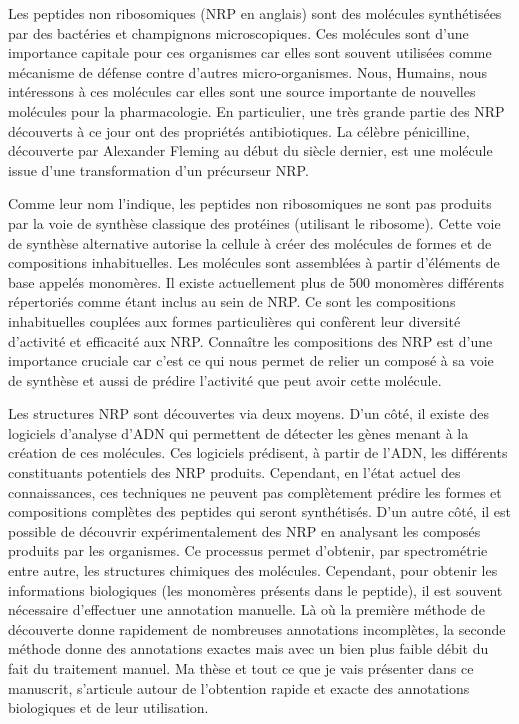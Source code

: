 Les peptides non ribosomiques (NRP en anglais) sont des molécules synthétisées par des bactéries et champignons microscopiques.
Ces molécules sont d'une importance capitale pour ces organismes car elles sont souvent utilisées comme mécanisme de défense contre d'autres micro-organismes.
Nous, Humains, nous intéressons à ces molécules car elles sont une source importante de nouvelles molécules pour la pharmacologie.
En particulier, une très grande partie des NRP découverts à ce jour ont des propriétés antibiotiques.
La célèbre pénicilline, découverte par Alexander Fleming au début du siècle dernier, est une molécule issue d'une transformation d'un précurseur NRP.

Comme leur nom l'indique, les peptides non ribosomiques ne sont pas produits par la voie de synthèse classique des protéines (utilisant le ribosome).
Cette voie de synthèse alternative autorise la cellule à créer des molécules de formes et de compositions inhabituelles.
Les molécules sont assemblées à partir d'éléments de base appelés monomères.
Il existe actuellement plus de 500 monomères différents répertoriés comme étant inclus au sein de NRP.
Ce sont les compositions inhabituelles couplées aux formes particulières qui confèrent leur diversité d'activité et efficacité aux NRP.
Connaître les compositions des NRP est d'une importance cruciale car c'est ce qui nous permet de relier un composé à sa voie de synthèse et aussi de prédire l'activité que peut avoir cette molécule.

Les structures NRP sont découvertes via deux moyens.
D'un côté, il existe des logiciels d'analyse d'ADN qui permettent de détecter les gènes menant à la création de ces molécules.
Ces logiciels prédisent, à partir de l'ADN, les différents constituants potentiels des NRP produits.
Cependant, en l'état actuel des connaissances, ces techniques ne peuvent pas complètement prédire les formes et compositions complètes des peptides qui seront synthétisés.
D'un autre côté, il est possible de découvrir expérimentalement des NRP en analysant les composés produits par les organismes.
Ce processus permet d'obtenir, par spectrométrie entre autre, les structures chimiques des molécules.
Cependant, pour obtenir les informations biologiques (les monomères présents dans le peptide), il est souvent nécessaire d'effectuer une annotation manuelle.
Là où la première méthode de découverte donne rapidement de nombreuses annotations incomplètes, la seconde méthode donne des annotations exactes mais avec un bien plus faible débit du fait du traitement manuel.
Ma thèse et tout ce que je vais présenter dans ce manuscrit, s'articule autour de l'obtention rapide et exacte des annotations biologiques et de leur utilisation.

